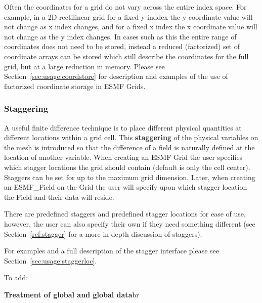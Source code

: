 Often the coordinates for a grid do not vary across the entire
index space. For example, in a 2D rectilinear grid for a fixed y
inddex the y coordinate value will not change as x index changes,
and for a fixed x index the x coordinate value will not change as the
y index changes. In cases such as this the entire range of 
coordinates does not need to be stored, instead a reduced
(factorized) set of coordinate arrays can be stored which 
still describe the coordinates for the full grid, but at a large reduction in 
memory. Please see Section~\ref{sec:usage:coordstore} for
description and examples of the use of factorized coordinate
storage in ESMF Grids. 

\subsubsection{Staggering}

 A useful finite difference technique is to place different physical
quantities at different locations within a grid cell. This {\bf staggering}
of the physical variables on the mesh is introduced so that the difference
of a field is naturally defined at the location of another variable. When creating an 
ESMF Grid the user specifies which stagger locations the grid should 
contain (default is only the cell center).  Staggers can be set for up to the 
maximum grid dimension.  Later, when creating an  ESMF\_Field on the Grid the user
will specify upon which stagger location the Field and their data will reside.

There are predefined staggers and predefined stagger locations for ease of use,
however, the user can also specify their own if they need something different 
(see Section~\ref{ref:stagger} for a more in depth discussion of staggers).
 
For examples and a full description of the stagger interface 
please see Section~\ref{sec:usage:staggerloc}. 

To add:

{\bf Treatment of global and global data}{br}
 


